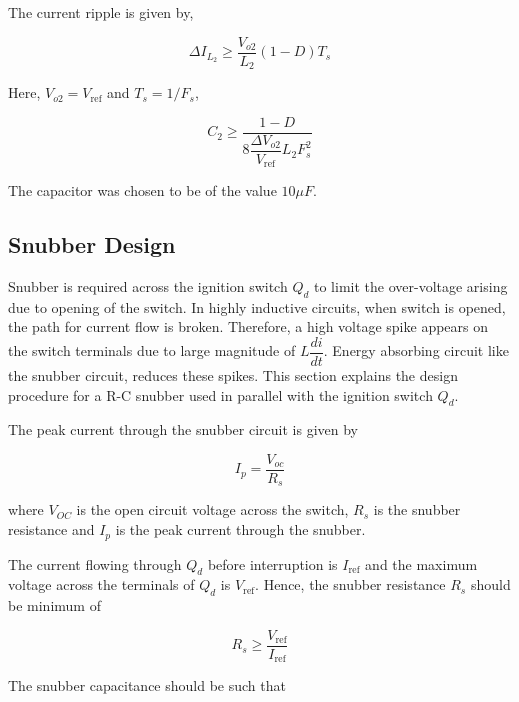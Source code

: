 \documentclass[a4paper]{IEEEtran}
\begin{document}
	The current ripple is given by,

	\begin{equation}
		\Delta I_{L_2} \geq \dfrac{V_{o2}}{L_2}(1-D) T_s
		\label{eq:ind-4b}
	\end{equation}

	Here, $V_{o2} = V_{\text{ref}}$ and $T_s = 1 / F_s$,

	\begin{equation}
		C_2 \geq \dfrac{1 - D}{8 \dfrac{\Delta V_{o2}}{V_{\text{ref}}}L_2 F_s^2}
		\label{eq:ind-5}
	\end{equation}

	The capacitor was chosen to be of the value $10 \mu F$.

\subsection{Snubber Design}
	Snubber is required across the ignition switch $Q_d$ to limit the over-voltage arising due to opening of the switch. In highly inductive circuits, when switch is opened, the path for current flow is broken. Therefore, a high voltage spike appears on the switch terminals due to large magnitude of $L\dfrac{di}{dt}$. Energy absorbing circuit like the snubber circuit, reduces these spikes. This section explains the design procedure for a R-C snubber used in parallel with the ignition switch $Q_d$.

	The peak current through the snubber circuit is given by

	\begin{equation}
		I_p = \dfrac{V_{oc}}{R_s}
		\label{eq:snub-1}
	\end{equation}

	where $V_{OC}$ is the open circuit voltage across the switch, $R_s$ is the snubber resistance and $I_p$ is the peak current through the snubber.

	The current flowing through $Q_d$ before interruption is $I_{\text{ref}}$ and the maximum voltage across the terminals of $Q_d$ is $V_{\text{ref}}$. Hence, the snubber resistance $R_s$ should be minimum of

	\begin{equation}
		R_s \geq \dfrac{V_{\text{ref}}}{I_{\text{ref}}}
		\label{eq:snub-2}
	\end{equation}

	The snubber capacitance should be such that
\end{document}
